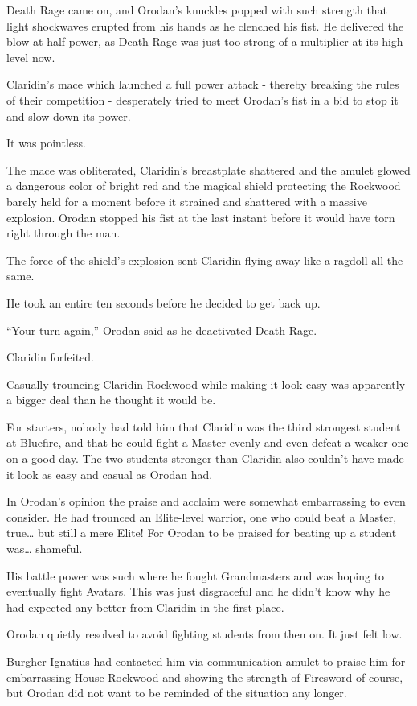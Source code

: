 \documentclass[a4paper,10pt]{book}
\begin{document}
Death Rage came on, and Orodan’s knuckles popped with such strength that light shockwaves erupted from his hands as he clenched his fist. He delivered the blow at half-power, as Death Rage was just too strong of a multiplier at its high level now.\par
Claridin’s mace which launched a full power attack - thereby breaking the rules of their competition - desperately tried to meet Orodan’s fist in a bid to stop it and slow down its power.\par
It was pointless.\par
The mace was obliterated, Claridin's breastplate shattered and the amulet glowed a dangerous color of bright red and the magical shield protecting the Rockwood barely held for a moment before it strained and shattered with a massive explosion. Orodan stopped his fist at the last instant before it would have torn right through the man.\par
The force of the shield’s explosion sent Claridin flying away like a ragdoll all the same.\par
He took an entire ten seconds before he decided to get back up.\par
“Your turn again,” Orodan said as he deactivated Death Rage.\par
Claridin forfeited.\par
\par
Casually trouncing Claridin Rockwood while making it look easy was apparently a bigger deal than he thought it would be.\par
For starters, nobody had told him that Claridin was the third strongest student at Bluefire, and that he could fight a Master evenly and even defeat a weaker one on a good day. The two students stronger than Claridin also couldn’t have made it look as easy and casual as Orodan had.\par
In Orodan’s opinion the praise and acclaim were somewhat embarrassing to even consider. He had trounced an Elite-level warrior, one who could beat a Master, true… but still a mere Elite! For Orodan to be praised for beating up a student was… shameful.\par
His battle power was such where he fought Grandmasters and was hoping to eventually fight Avatars. This was just disgraceful and he didn’t know why he had expected any better from Claridin in the first place.\par
Orodan quietly resolved to avoid fighting students from then on. It just felt low.\par
Burgher Ignatius had contacted him via communication amulet to praise him for embarrassing House Rockwood and showing the strength of Firesword of course, but Orodan did not want to be reminded of the situation any longer.\par
\end{document}
